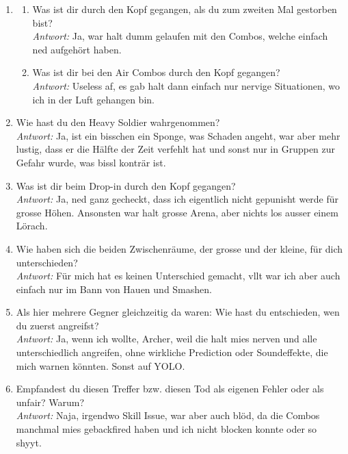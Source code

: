 \documentclass[../Main.tex]{subfiles}
\begin{document}
\begin{enumerate}[label=\textbf{I\arabic*}, leftmargin=1.5cm, itemsep=1em]
\item
\begin{enumerate}[label=\alph*), itemsep=0.6em]
\item Was ist dir durch den Kopf gegangen, als du zum zweiten Mal gestorben bist? \\
    \textit{Antwort:} Ja, war halt dumm gelaufen mit den Combos, welche einfach ned aufgehört haben.
\item Was ist dir bei den Air Combos durch den Kopf gegangen? \\
    \textit{Antwort:} Useless af, es gab halt dann einfach nur nervige Situationen, wo ich in der Luft gehangen bin.
\end{enumerate}

\item Wie hast du den Heavy Soldier wahrgenommen? \\
\textit{Antwort:} Ja, ist ein bisschen ein Sponge, was Schaden angeht, war aber mehr lustig, dass er die Hälfte der Zeit verfehlt hat und sonst nur in Gruppen zur Gefahr wurde, was bissl konträr ist.

\item Was ist dir beim Drop-in durch den Kopf gegangen? \\
\textit{Antwort:} Ja, ned ganz gecheckt, dass ich eigentlich nicht gepunisht werde für grosse Höhen. Ansonsten war halt grosse Arena, aber nichts los ausser einem Lörach.

\item Wie haben sich die beiden Zwischenräume, der grosse und der kleine, für dich unterschieden? \\
\textit{Antwort:} Für mich hat es keinen Unterschied gemacht, vllt war ich aber auch einfach nur im Bann von Hauen und Smashen.

\item Als hier mehrere Gegner gleichzeitig da waren: Wie hast du entschieden, wen du zuerst angreifst? \\
\textit{Antwort:} Ja, wenn ich wollte, Archer, weil die halt mies nerven und alle unterschiedlich angreifen, ohne wirkliche Prediction oder Soundeffekte, die mich warnen könnten. Sonst auf YOLO.

\item Empfandest du diesen Treffer bzw. diesen Tod als eigenen Fehler oder als unfair? Warum? \\
\textit{Antwort:} Naja, irgendwo Skill Issue, war aber auch blöd, da die Combos manchmal mies gebackfired haben und ich nicht blocken konnte oder so shyyt.


\end{enumerate}
\end{document}
